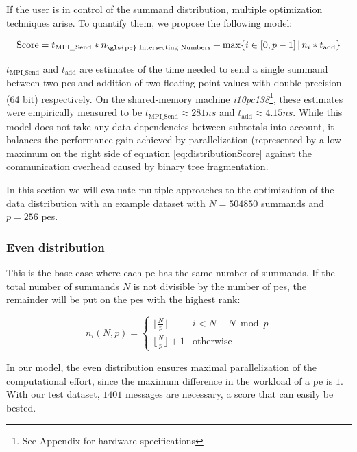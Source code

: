 If the user is in control of the summand distribution, multiple optimization techniques arise. To quantify them, we propose the following model:

\begin{equation}
\label{eq:distributionScore}
\textrm{Score} = t_{\textrm{MPI\_Send}} * n_{\textrm{\gls{pe} Intersecting Numbers}} + \max \{ i \in [0, p - 1]\, |\, n_i * t_{\textrm{add}} \}
\end{equation}

$t_{\textrm{MPI\_Send}}$ and $t_\textrm{add}$ are estimates of the time needed to send a single summand between two \glspl{pe} and addition of two
floating-point values with double precision (64 bit) respectively. On the shared-memory machine \textit{i10pc138}\footnote{See Appendix for hardware specifications}, these
estimates were empirically measured to be $t_{\textrm{MPI\_Send}} \approx 281ns$ and $t_\textrm{add} \approx 4.15ns$. While this model does not
take any data dependencies between subtotals into account, it balances the performance gain achieved by parallelization (represented by a low maximum
on the right side of equation \eqref{eq:distributionScore} against the communication overhead caused by binary tree fragmentation. 

In this section we will evaluate multiple approaches to the optimization of the data distribution with an example dataset with $N = 504 850$ summands
and $p = 256$ \glspl{pe}.


\subsubsection{Even distribution}
This is the base case where each \gls{pe} has the same number of summands. If the total number of summands $N$ is not divisible by the number of
\glspl{pe}, the remainder will be put on the \glspl{pe} with the highest rank:

\begin{equation}
\label{eq:evenDistribution}
n_i (N, p) = \begin{cases}
\lfloor \tfrac{N}{p} \rfloor & i < N - N \bmod p \\
\lfloor \tfrac{N}{p} \rfloor + 1 & \textrm{otherwise}
\end{cases}
\end{equation}

In our model, the even distribution ensures maximal parallelization of the computational effort, since the maximum difference in the workload of a
\gls{pe} is $1$. With our test dataset, $1401$ messages are necessary, a score that can easily be bested.

